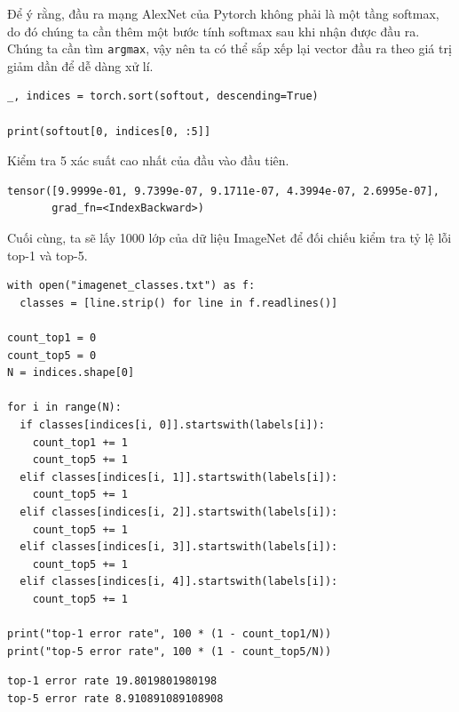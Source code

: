 \documentclass[a4paper]{article}
\begin{document}
\noindent
Để ý rằng, đầu ra mạng AlexNet của Pytorch không phải là một tầng softmax, do đó chúng ta cần thêm một bước tính softmax sau khi nhận được đầu ra.\\
Chúng ta cần tìm \texttt{argmax}, vậy nên ta có thể sắp xếp lại vector đầu ra theo giá trị giảm dần để dễ dàng xử lí.
\begin{lstlisting}
_, indices = torch.sort(softout, descending=True)

print(softout[0, indices[0, :5]]
\end{lstlisting}
Kiểm tra 5 xác suất cao nhất của đầu vào đầu tiên.
\begin{verbatim}
tensor([9.9999e-01, 9.7399e-07, 9.1711e-07, 4.3994e-07, 2.6995e-07],
       grad_fn=<IndexBackward>)
\end{verbatim}
Cuối cùng, ta sẽ lấy 1000 lớp của dữ liệu ImageNet để đối chiếu kiểm tra tỷ lệ lỗi top-1 và top-5.
\begin{lstlisting}
with open("imagenet_classes.txt") as f:
  classes = [line.strip() for line in f.readlines()]
  
count_top1 = 0
count_top5 = 0
N = indices.shape[0]

for i in range(N):
  if classes[indices[i, 0]].startswith(labels[i]):
    count_top1 += 1
    count_top5 += 1
  elif classes[indices[i, 1]].startswith(labels[i]):
    count_top5 += 1
  elif classes[indices[i, 2]].startswith(labels[i]):
    count_top5 += 1
  elif classes[indices[i, 3]].startswith(labels[i]):
    count_top5 += 1
  elif classes[indices[i, 4]].startswith(labels[i]):
    count_top5 += 1

print("top-1 error rate", 100 * (1 - count_top1/N))
print("top-5 error rate", 100 * (1 - count_top5/N))
\end{lstlisting}
\begin{verbatim}
top-1 error rate 19.8019801980198
top-5 error rate 8.910891089108908
\end{verbatim}
\end{document}
